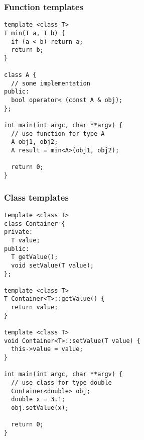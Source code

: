 \begin{frame}[fragile] 
\frametitle{Function templates}
{\tiny
\begin{lstlisting}
template <class T>
T min(T a, T b) {
  if (a < b) return a;
  return b;
}

class A {
  // some implementation
public:
  bool operator< (const A & obj);
};

int main(int argc, char **argv) {
  // use function for type A
  A obj1, obj2;
  A result = min<A>(obj1, obj2);
  
  return 0;
}
\end{lstlisting}
}
\end{frame}

\begin{frame}[fragile] 
\frametitle{Class templates}
{\tiny
\begin{lstlisting}
template <class T>
class Container {
private:
  T value;
public:
  T getValue();
  void setValue(T value);
};

template <class T>
T Container<T>::getValue() {
  return value;
}

template <class T>
void Container<T>::setValue(T value) {
  this->value = value;
}

int main(int argc, char **argv) {
  // use class for type double
  Container<double> obj;
  double x = 3.1;
  obj.setValue(x);
  
  return 0;
}
\end{lstlisting}
}

\end{frame}

